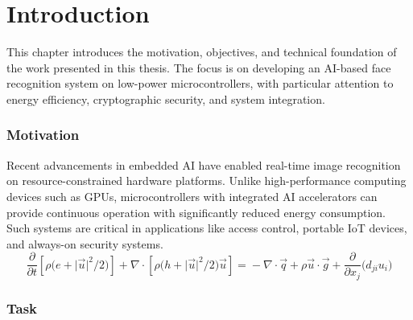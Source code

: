
\chapter{Introduction}
This chapter introduces the motivation, objectives, and technical foundation of the work presented in this thesis. The focus is on developing an AI-based face recognition system on low-power microcontrollers, with particular attention to energy efficiency, cryptographic security, and system integration.

\subsection{Motivation}

Recent advancements in embedded AI have enabled real-time image recognition on resource-constrained hardware platforms. Unlike high-performance computing devices such as GPUs, microcontrollers with integrated AI accelerators can provide continuous operation with significantly reduced energy consumption. Such systems are critical in applications like access control, portable IoT devices, and always-on security systems. 
\begin{equation}\label{eqn:1}
	\frac{\partial}{\partial t}\left[\rho\bigl(e + \lvert\vec{u}\rvert^2\big/2\bigr)\right]  + \nabla\cdot\left[\rho\bigl(h + \lvert\vec{u}\rvert^2\big/2 \bigr)\vec{u}\right]
	={}-\nabla \cdot \vec{q} +  \rho \vec{u}\cdot\vec{g}+ \frac{\partial}{\partial x_j}\bigl(d_{ji}u_i\bigr)
\end{equation}
\lipsum[3]
\subsection{Task}



